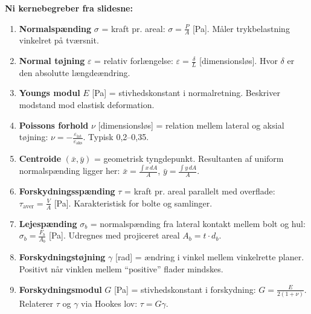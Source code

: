 \begin{nembox}

\textbf{Ni kernebegreber fra slidesne:}

\begin{enumerate}
  \item \textbf{Normalspænding} $\sigma$ = kraft pr. areal: $\sigma = \frac{P}{A}$ [Pa]. Måler trykbelastning vinkelret på tværsnit.

  \item \textbf{Normal tøjning} $\varepsilon$ = relativ forlængelse: $\varepsilon = \frac{\delta}{L}$ [dimensionsløs]. Hvor $\delta$ er den absolutte længdeændring.

  \item \textbf{Youngs modul} $E$ [Pa] = stivhedskonstant i normalretning. Beskriver modstand mod elastisk deformation.

  \item \textbf{Poissons forhold} $\nu$ [dimensionsløs] = relation mellem lateral og aksial tøjning: $\nu = -\frac{\varepsilon_{\text{lat}}}{\varepsilon_{\text{aks}}}$. Typisk 0,2--0,35.

  \item \textbf{Centroide} $(\bar{x}, \bar{y})$ = geometrisk tyngdepunkt. Resultanten af uniform normalspænding ligger her: $\bar{x} = \frac{\int x \, dA}{A}$, $\bar{y} = \frac{\int y \, dA}{A}$.

  \item \textbf{Forskydningsspænding} $\tau$ = kraft pr. areal parallelt med overflade: $\tau_{\text{aver}} = \frac{V}{A}$ [Pa]. Karakteristisk for bolte og samlinger.

  \item \textbf{Lejespænding} $\sigma_b$ = normalspænding fra lateral kontakt mellem bolt og hul: $\sigma_b = \frac{F_b}{A_b}$ [Pa]. Udregnes med projiceret areal $A_b = t \cdot d_b$.

  \item \textbf{Forskydningstøjning} $\gamma$ [rad] = ændring i vinkel mellem vinkelrette planer. Positivt når vinklen mellem ``positive'' flader mindskes.

  \item \textbf{Forskydningsmodul} $G$ [Pa] = stivhedskonstant i forskydning: $G = \frac{E}{2(1+\nu)}$. Relaterer $\tau$ og $\gamma$ via Hookes lov: $\tau = G\gamma$.

\end{enumerate}

\end{nembox}

